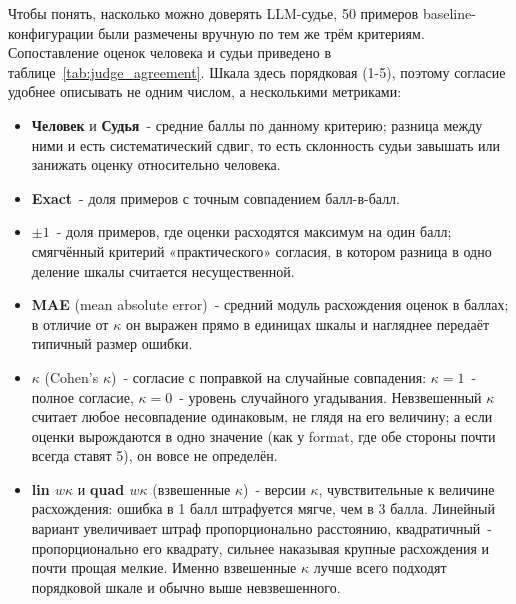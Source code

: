 \documentclass[a4paper,12pt]{article}
\begin{document}
Чтобы понять, насколько можно доверять LLM-судье, 50 примеров baseline-конфигурации были размечены вручную по тем же трём критериям. Сопоставление оценок человека и судьи приведено в таблице~\ref{tab:judge_agreement}. Шкала здесь порядковая (1-5), поэтому согласие удобнее описывать не одним числом, а несколькими метриками:
\begin{itemize}
  \item \textbf{Человек} и \textbf{Судья}~- средние баллы по данному критерию; разница между ними и есть систематический сдвиг, то есть склонность судьи завышать или занижать оценку относительно человека.
  \item \textbf{Exact}~- доля примеров с точным совпадением балл-в-балл.
  \item \textbf{$\pm 1$}~- доля примеров, где оценки расходятся максимум на один балл; смягчённый критерий «практического» согласия, в котором разница в одно деление шкалы считается несущественной.
  \item \textbf{MAE} (mean absolute error)~- средний модуль расхождения оценок в баллах; в отличие от $\kappa$ он выражен прямо в единицах шкалы и нагляднее передаёт типичный размер ошибки.
  \item \textbf{$\kappa$} (Cohen's $\kappa$)~- согласие с поправкой на случайные совпадения: $\kappa=1$~- полное согласие, $\kappa=0$~- уровень случайного угадывания. Невзвешенный $\kappa$ считает любое несовпадение одинаковым, не глядя на его величину; а если оценки вырождаются в одно значение (как у format, где обе стороны почти всегда ставят 5), он вовсе не определён.
  \item \textbf{lin $w\kappa$} и \textbf{quad $w\kappa$} (взвешенные $\kappa$)~- версии $\kappa$, чувствительные к величине расхождения: ошибка в 1 балл штрафуется мягче, чем в 3 балла. Линейный вариант увеличивает штраф пропорционально расстоянию, квадратичный~- пропорционально его квадрату, сильнее наказывая крупные расхождения и почти прощая мелкие. Именно взвешенные $\kappa$ лучше всего подходят порядковой шкале и обычно выше невзвешенного.
\end{itemize}

\begin{table}[H]
\centering
\caption{Согласованность LLM-судьи с ручной разметкой (baseline, $n=50$)}
\label{tab:judge_agreement}
\end{table}
\FloatBarrier
\end{document}
